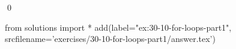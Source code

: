 
\begin{ex}
  \label{ex:30-10-for-loops-part1}
  
  \qed
\end{ex}
\begin{python0}
from solutions import *
add(label="ex:30-10-for-loops-part1",
    srcfilename='exercises/30-10-for-loops-part1/answer.tex')
\end{python0}
